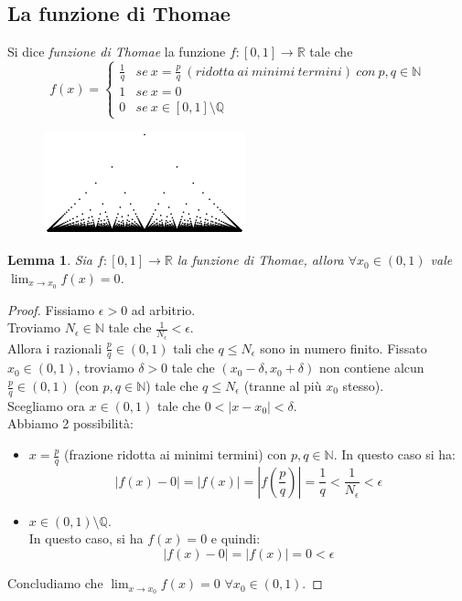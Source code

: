 \documentclass[10pt]{article}
\theoremstyle{plain}
\newtheorem{lem}[thm]{Lemma}
\theoremstyle{definition}
\begin{document}
\subsection{La funzione di Thomae}

Si dice \textit{funzione di Thomae} la funzione $f:[0,1] \to \mathbb{R}$ tale che 
$$f(x) = \begin{cases} \frac{1}{q} & se\ x=\frac{p}{q} \ (ridotta\  ai\ minimi\ termini)\ con\ p,q \in \mathbb{N} \\ 1 & se\ x=0 \\ 0 & se\ x \in [0,1]\setminus \mathbb{Q} \end{cases}$$
\begin{figure}[ht]
\centering
\centerline{\includegraphics[width=85 mm,scale=1]{fig11.png}}
\label{fig: }
\end{figure}
\begin{lem}
Sia $f:[0,1] \to \mathbb{R}$ la funzione di Thomae, allora $\forall x_0 \in (0,1)$ vale $\lim_{x \to x_0} f(x) = 0$.
\end{lem} 
\begin{proof}
Fissiamo $\epsilon >0$ ad arbitrio.\\
Troviamo $N_{\epsilon} \in \mathbb{N}$ tale che $\frac{1}{N_{\epsilon}} < \epsilon.$\\
Allora i razionali $\frac{p}{q} \in (0,1)$ tali che $q \le N_{\epsilon}$ sono in numero finito. Fissato $x_0 \in (0,1)$, troviamo $\delta >0$ tale che $(x_0 -\delta, x_0 +\delta)$ non contiene alcun $\frac{p}{q} \in (0,1)$ (con $p,q \in \mathbb{N}$) tale che $q \le N_{\epsilon}$ (tranne al più $x_0$ stesso).\\
Scegliamo ora $x \in (0,1)$ tale che $0<|x-x_0|<\delta$.\\
Abbiamo 2 possibilità:
\begin{itemize}
    \item $x=\frac{p}{q}$ (frazione ridotta ai minimi termini) con $p,q \in \mathbb{N}$. In questo caso si ha:
    $$\left| f(x)-0 \right| = \left| f(x) \right| = \left| f\left(\frac{p}{q}\right) \right| = \frac{1}{q} < \frac{1}{N_{\epsilon}}<\epsilon$$
    \item $x \in (0,1) \setminus \mathbb{Q}$.\\
    In questo caso, si ha $f(x)=0$ e quindi:
    $$\left| f(x)-0 \right| = \left| f(x) \right| = 0<\epsilon$$
\end{itemize}
Concludiamo che $\lim_{x \to x_0} f(x) =0$ \qquad $\forall x_0 \in (0,1)$.
\end{proof}
\end{document}
